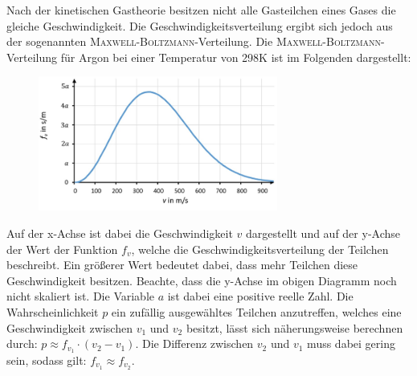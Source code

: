 \documentclass[../kl10.tex]{subfiles}
\begin{document}
Nach der kinetischen Gastheorie besitzen nicht alle Gasteilchen eines Gases die gleiche Geschwindigkeit. Die Geschwindigkeitsverteilung ergibt sich jedoch aus der sogenannten \textsc{Maxwell-Boltzmann}-Verteilung. Die \textsc{Maxwell-Boltzmann}-Verteilung für Argon bei einer Temperatur von 298\thinspace K ist im Folgenden dargestellt:

\begin{figure}[H]
    \centering
    \includegraphics[width=0.7\textwidth]{2024/Abbildungen/Kinetisch_Gas/M-B-Verteilung.png}
\end{figure}

Auf der x-Achse ist dabei die Geschwindigkeit $v$ dargestellt und auf der y-Achse der Wert der Funktion $f_v$, welche die Geschwindigkeitsverteilung der Teilchen beschreibt. Ein größerer Wert bedeutet dabei, dass mehr Teilchen diese Geschwindigkeit besitzen. Beachte, dass die y-Achse im obigen Diagramm noch nicht skaliert ist. Die Variable $a$ ist dabei eine positive reelle Zahl. 
Die Wahrscheinlichkeit $p$ ein zufällig ausgewähltes Teilchen anzutreffen, welches eine Geschwindigkeit zwischen $v_1$ und $v_2$ besitzt, lässt sich näherungsweise berechnen durch:
$p\approx f_{v_1}\cdot (v_2-v_1)$.
Die Differenz zwischen $v_2$ und $v_1$ muss dabei gering sein, sodass gilt: $f_{v_1} \approx f_{v_2}$.

\newpage



\end{document}
